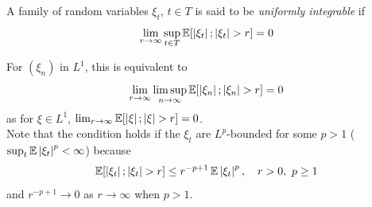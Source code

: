 \begin{definition}
    A family of random variables $\xi_t$, $t \in T$ is said to be \emph{uniformly integrable} if
    \[ \lim_{r \to \infty} \sup_{t \in T} \mathbb{E}[\left\lvert {\xi_t} \right\rvert ; \left\lvert {\xi_t} \right\rvert > r] = 0 \]
\end{definition}

For $(\xi_n)$ in $L^1$, this is equivalent to
\[ \lim_{r \to \infty} \limsup_{n \to \infty} \mathbb{E}[\left\lvert {\xi_n} \right\rvert ; \left\lvert {\xi_n} \right\rvert > r] = 0 \]
as for $\xi \in L^1$, $\lim_{r \to \infty} \mathbb{E}[\left\lvert {\xi} \right\rvert ; \left\lvert {\xi} \right\rvert > r] = 0$.\\

Note that the condition holds if the $\xi_t$ are $L^p$-bounded for some $p > 1$ ($\sup_t \mathbb{E}\left\lvert {\xi_t} \right\rvert^p < \infty$) because
\[ \mathbb{E}[\left\lvert {\xi_t} \right\rvert ; \left\lvert {\xi_t} \right\rvert > r] \leq r^{-p + 1}\,\mathbb{E}\left\lvert {\xi_t} \right\rvert^p, \quad r > 0,\ p \geq 1 \]
and $r^{-p + 1} \to 0$ as $r \to \infty$ when $p > 1$.
